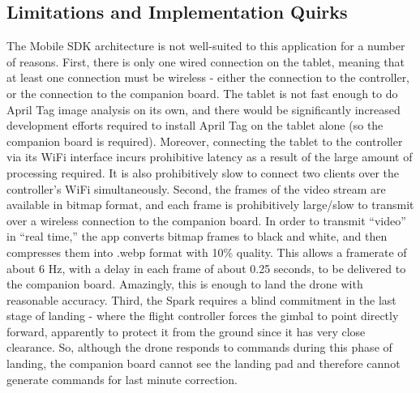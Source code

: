 \subsection{Limitations and Implementation Quirks}

The Mobile SDK architecture is not well-suited to this application for a number of reasons.
First, there is only one wired connection on the tablet, meaning that at least one connection
must be wireless - either the connection to the controller, or the connection to the companion board.
The tablet is not fast enough to do April Tag image analysis on its own,
and there would be significantly increased development efforts required to install April Tag
on the tablet alone (so the companion board is required).
Moreover, connecting the tablet to the controller via its WiFi interface incurs prohibitive latency
as a result of the large amount of processing required.
It is also prohibitively slow to connect two clients over the controller's WiFi simultaneously.
Second, the frames of the video stream are available in bitmap format,
and each frame is prohibitively large/slow to transmit over a wireless connection to the companion board.
In order to transmit ``video'' in ``real time,'' the app converts bitmap frames to black and white,
and then compresses them into .webp format with 10\% quality.
This allows a framerate of about 6 Hz, with a delay in each frame of about 0.25 seconds,
to be delivered to the companion board.
Amazingly, this is enough to land the drone with reasonable accuracy.
Third, the Spark requires a blind commitment in the last stage of landing
- where the flight controller forces the gimbal to point directly forward,
apparently to protect it from the ground since it has very close clearance.
So, although the drone responds to commands during this phase of landing,
the companion board cannot see the landing pad and therefore cannot generate commands
for last minute correction.